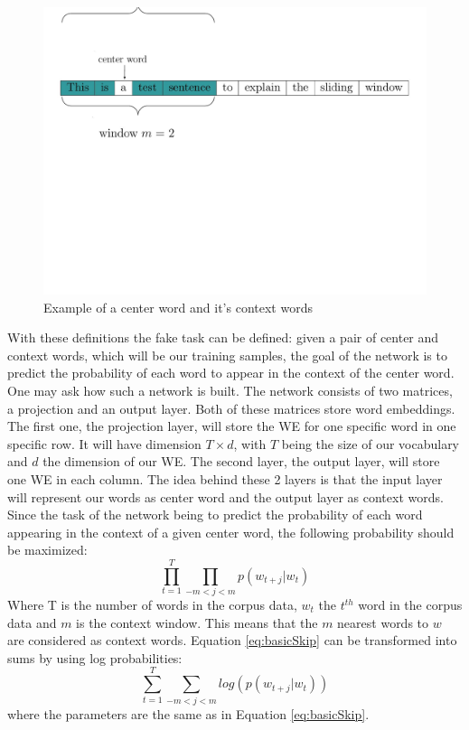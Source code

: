 \begin{figure}[h]
\centering
\includegraphics[scale=0.3]{images/window_ex}
\caption{Example of a center word and it's context words}
\label{fig:window_ex}
\end{figure}
With these definitions the fake task can be defined: given a pair of center and context words, which will be our training samples, the goal of the network is to predict the probability of each word to appear in the context of the center word. One may ask how such a network is built. The network consists of two matrices, a projection and an output layer. Both of these matrices store word embeddings. The first one, the projection layer, will store the WE for one specific word in one specific row. It will have dimension $T\times d$, with $T$ being the size of our vocabulary and $d$ the dimension of our WE. The second layer, the output layer, will store one WE in each column. The idea behind these 2 layers is that the input layer will represent our words as center word and the output layer as context words. Since the task of the network being to predict the probability of each word appearing in the context of a given center word, the following probability should be maximized:\\
\begin{equation} \label{eq:basicSkip}
\prod_{t=1}^T \prod_{-m<j<m} p(w_{t+j}|w_t)
\end{equation}
Where T is the number of words in the corpus data, $w_t$ the $t^{th}$ word in the corpus data and $m$ is the context window. This means that the $m$ nearest words to $w$ are considered as context words.
Equation \ref{eq:basicSkip} can be transformed into sums by using log probabilities:
\begin{equation}
\sum _{t=1}^T \sum_{-m<j<m} log( p(w_{t+j}|w_t) )
\end{equation}
where the parameters are the same as in Equation \ref{eq:basicSkip}.

